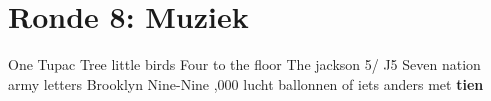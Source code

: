 
\section{Ronde 8: Muziek}
\begin{questions}

\question[2] One
\vspace{5mm}
\question[2] Tupac
\vspace{5mm}
\question[2] Tree little birds
\vspace{5mm}
\question[2] Four to the floor
\vspace{5mm}
\question[2] The jackson 5/ J5
\vspace{5mm}
\vspace{5mm}
\question[2] Seven nation army
\vspace{5mm}
 letters
\vspace{5mm}
\question[2] Brooklyn Nine-Nine
\vspace{5mm}
,000 lucht ballonnen of iets anders met \bf{tien}

\end{questions}
\newpage
